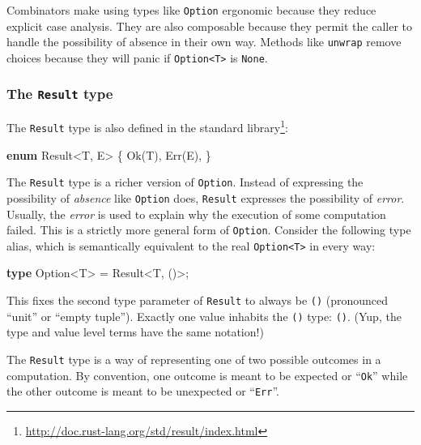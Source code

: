 \documentclass[a4paper,]{book}
\renewcommand*{\hypertarget}[3][\ar]{%
  \def\ar{#2}%
  \label{#1}%
  #3}
\newenvironment{Shaded}{\begin{snugshade}}{\end{snugshade}}
\newcommand{\KeywordTok}[1]{\textcolor[rgb]{0.13,0.29,0.53}{\textbf{{#1}}}}
\newcommand{\DataTypeTok}[1]{\textcolor[rgb]{0.13,0.29,0.53}{{#1}}}
\newcommand{\ConstantTok}[1]{\textcolor[rgb]{0.00,0.00,0.00}{{#1}}}
\newcommand{\NormalTok}[1]{{#1}}
\renewcommand{\href}[2]{#2\footnote{\url{#1}}}
\begin{document}
Combinators make using types like \texttt{Option} ergonomic because they
reduce explicit case analysis. They are also composable because they
permit the caller to handle the possibility of absence in their own way.
Methods like \texttt{unwrap} remove choices because they will panic if
\texttt{Option\textless{}T\textgreater{}} is \texttt{None}.

\hypertarget{the-result-type}{\subsubsection{\texorpdfstring{The
\texttt{Result} type}{The Result type}}\label{the-result-type}}

The \texttt{Result} type is also
\href{http://doc.rust-lang.org/std/result/index.html}{defined in the
standard library}:

\protect\hypertarget{code-result-def}{}{}

\begin{Shaded}
\begin{Highlighting}[]
\KeywordTok{enum} \DataTypeTok{Result}\NormalTok{<T, E> \{}
    \ConstantTok{Ok}\NormalTok{(T),}
    \ConstantTok{Err}\NormalTok{(E),}
\NormalTok{\}}
\end{Highlighting}
\end{Shaded}

The \texttt{Result} type is a richer version of \texttt{Option}. Instead
of expressing the possibility of \emph{absence} like \texttt{Option}
does, \texttt{Result} expresses the possibility of \emph{error}.
Usually, the \emph{error} is used to explain why the execution of some
computation failed. This is a strictly more general form of
\texttt{Option}. Consider the following type alias, which is
semantically equivalent to the real
\texttt{Option\textless{}T\textgreater{}} in every way:

\begin{Shaded}
\begin{Highlighting}[]
\KeywordTok{type} \NormalTok{Option<T> = }\DataTypeTok{Result}\NormalTok{<T, ()>;}
\end{Highlighting}
\end{Shaded}

This fixes the second type parameter of \texttt{Result} to always be
\texttt{()} (pronounced ``unit'' or ``empty tuple''). Exactly one value
inhabits the \texttt{()} type: \texttt{()}. (Yup, the type and value
level terms have the same notation!)

The \texttt{Result} type is a way of representing one of two possible
outcomes in a computation. By convention, one outcome is meant to be
expected or ``\texttt{Ok}'' while the other outcome is meant to be
unexpected or ``\texttt{Err}''.
\end{document}
